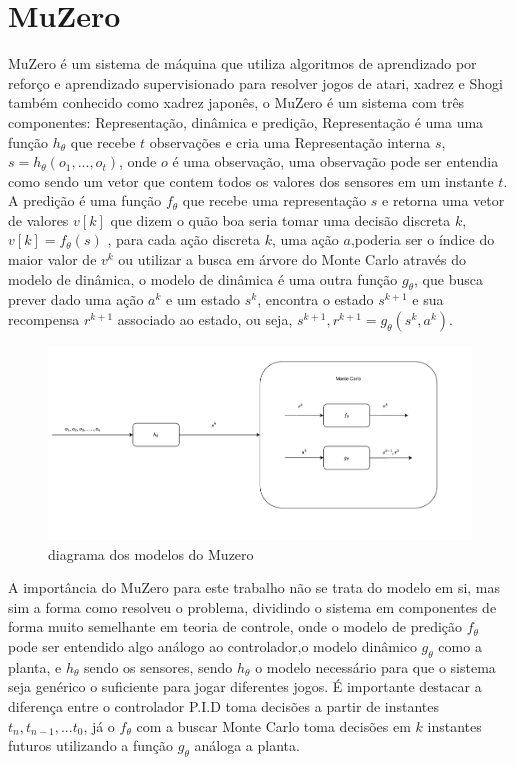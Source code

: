 
\label{Cap:TrabalhosRelacionados}


\section{MuZero}

MuZero é um sistema de máquina que utiliza algoritmos de
aprendizado por reforço e aprendizado supervisionado para
resolver jogos de atari, xadrez e Shogi também conhecido como
xadrez japonês, o MuZero é um sistema com três componentes:
Representação, dinâmica e predição, Representação é uma uma
função $h_{\theta}$  que recebe $t$ observações 
e cria uma Representação interna $s$, $s = h_{\theta}(o_1,...,o_t)$,
onde $o$ é uma observação, uma observação pode ser entendia como sendo
um vetor que contem todos os valores dos sensores em um instante $t$.
A predição é uma função $f_{\theta}$ que recebe uma representação $s$
e retorna uma vetor de valores $v[k]$ que dizem o quão boa seria tomar
uma decisão discreta $k$,  $v[k] =  f_{\theta}(s)$ ,
para cada ação discreta $k$, uma ação $a$,poderia ser o índice do maior
valor de $v^{k}$ ou utilizar a busca em árvore do Monte Carlo através do
modelo de dinâmica, o modelo de dinâmica é uma outra função
$g_{\theta}$, que busca prever dado uma ação $a^k$ e um estado $s^{k}$,
encontra o estado $s^{k+1}$ e sua recompensa $r^{k+1}$ associado ao estado,
ou seja, $s^{k+1},r^{k+1}=  g_{\theta}(s^{k},a^k)$.


\begin{figure}[H]
    \centering
    \includegraphics[scale=0.4]{figuras/muzero_dig.pdf}
    \caption{diagrama dos modelos do Muzero}
\end{figure}

A importância do MuZero para este trabalho não se trata do modelo em si,
mas sim a forma como resolveu o problema, dividindo o sistema em componentes
de forma muito semelhante  em teoria de controle, onde
o modelo de predição  $f_{\theta}$ pode ser entendido algo
análogo ao controlador,o  modelo dinâmico $g_{\theta}$ como a planta,
e $h_{\theta}$ sendo os sensores, sendo $h_{\theta}$ o modelo
necessário  para que o sistema seja genérico o suficiente para jogar
diferentes jogos. É importante destacar a diferença entre o controlador P.I.D
toma decisões a partir de instantes $t_n,t_{n-1},...t_{0}$, já o $f_{\theta}$
com a buscar Monte Carlo toma decisões em $k$ instantes futuros utilizando
a função $g_{\theta}$ análoga a planta.


